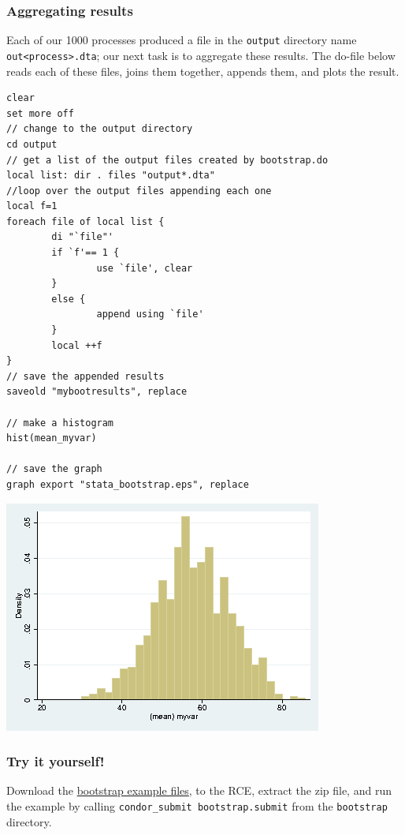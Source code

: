 \documentclass[11pt]{article}
\begin{document}
\subsubsection{Aggregating results}
\label{sec:org1f13dd6}
Each of our 1000 processes produced a file in the \texttt{output} directory name \texttt{out<process>.dta}; our next task is to aggregate these results. The do-file below reads each of these files, joins them together, appends them, and plots the result.
\begin{verbatim}
clear
set more off
// change to the output directory
cd output
// get a list of the output files created by bootstrap.do
local list: dir . files "output*.dta"
//loop over the output files appending each one
local f=1
foreach file of local list {
        di "`file"'
        if `f'== 1 {
                use `file', clear
        }
        else {
                append using `file'
        }
        local ++f
}
// save the appended results
saveold "mybootresults", replace

// make a histogram
hist(mean_myvar)

// save the graph
graph export "stata_bootstrap.eps", replace

\end{verbatim}

\begin{center}
\includegraphics[width=.9\linewidth]{images/stata_bootstrap.png}
\end{center}
\subsubsection{Try it yourself!}
\label{sec:orgd88754e}
Download the \href{Stata\_examples/bootstrap.zip}{bootstrap example files}, to the RCE, extract the zip file, and run the example by calling \texttt{condor\_submit bootstrap.submit} from the \texttt{bootstrap} directory.
\end{document}
